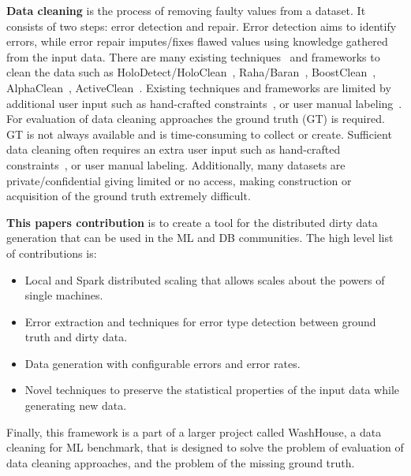 \textbf{Data cleaning} is the process of removing faulty values from a dataset.
It consists of two steps: error detection and repair.
Error detection aims to identify errors, while error repair imputes/fixes flawed values using knowledge gathered from the input data. 
There are many existing techniques~\cite{duplicatesstudy, tdeexcel} and frameworks to clean the data such as HoloDetect/HoloClean~\cite{holodetect, RekatsinasCIR2017}, Raha/Baran~\cite{raha, baran}, BoostClean~\cite{boostclean}, AlphaClean~\cite{alphaclean}, ActiveClean~\cite{activeclean}. 
Existing techniques and frameworks are limited by additional user input such as hand-crafted constraints~\cite{bart}, or user manual labeling~\cite{raha, baran}.
For evaluation of data cleaning approaches the ground truth (GT) is required.
GT is not always available and is time-consuming to collect or create.
Sufficient data cleaning often requires an extra user input such as hand-crafted constraints~\cite{bart}, or user manual labeling.
Additionally, many datasets are private/confidential giving limited or no access, making construction or acquisition of the ground truth extremely difficult. 

\textbf{This papers contribution} is to create a tool for the distributed dirty data generation that can be used in the ML and DB communities. 
The high level list of contributions is:

\begin{itemize}
    \item Local and Spark distributed scaling that allows scales about the powers of single machines.
    \item Error extraction and techniques for error type detection between ground truth and dirty data.
    \item Data generation with configurable errors and error rates.
    \item Novel techniques to preserve the statistical properties of the input data while generating new data.
\end{itemize}

Finally, this framework is a part of a larger project called WashHouse, a data cleaning for ML benchmark, that is designed to solve the problem of evaluation of data cleaning approaches, and the problem of the missing ground truth.

